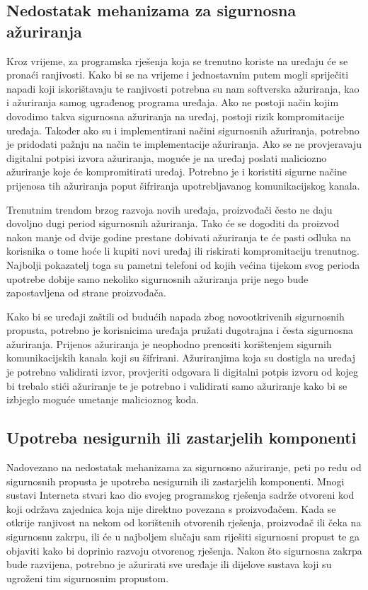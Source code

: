 \documentclass[times, utf8, diplomski]{fer}
\begin{document}
\subsection{Nedostatak mehanizama za sigurnosna ažuriranja}
Kroz vrijeme, za programska rješenja koja se trenutno koriste na uređaju će se pronaći ranjivosti. Kako bi se na vrijeme i jednostavnim putem mogli spriječiti napadi koji iskorištavaju te ranjivosti potrebna su nam softverska ažuriranja, kao i ažuriranja samog ugrađenog programa  uređaja. Ako ne postoji način kojim dovodimo takva sigurnosna ažuriranja na uređaj, postoji rizik kompromitacije uređaja. Također ako su i implementirani načini sigurnosnih ažuriranja, potrebno je pridodati pažnju na način te implementacije ažuriranja. Ako se ne provjeravaju digitalni potpisi izvora ažuriranja, moguće je na uređaj poslati maliciozno ažuriranje koje će kompromitirati uređaj. Potrebno je i koristiti sigurne načine prijenosa tih ažuriranja poput šifriranja upotrebljavanog komunikacijskog kanala. 

Trenutnim trendom brzog razvoja novih uređaja, proizvođači često ne daju dovoljno dugi period sigurnosnih ažuriranja. Tako će se dogoditi da proizvod nakon manje od dvije godine prestane dobivati ažuriranja te će pasti odluka na korisnika o tome hoće li kupiti novi uređaj ili riskirati kompromitaciju trenutnog. Najbolji pokazatelj toga su pametni telefoni od kojih većina tijekom svog perioda upotrebe dobije samo nekoliko sigurnosnih ažuriranja prije nego bude zapostavljena od strane proizvođača.

Kako bi se uređaji zaštili od budućih napada zbog novootkrivenih sigurnosnih propusta, potrebno je korisnicima uređaja pružati dugotrajna i česta sigurnosna ažuriranja. Prijenos ažuriranja je neophodno prenositi korištenjem sigurnih komunikacijskih kanala koji su šifrirani. Ažuriranjima koja su dostigla na uređaj je potrebno validirati izvor, provjeriti odgovara li digitalni potpis izvoru od kojeg bi trebalo stići ažuriranje te je potrebno i validirati samo ažuriranje kako bi se izbjeglo moguće umetanje malicioznog koda.

\subsection{Upotreba nesigurnih ili zastarjelih komponenti}
Nadovezano na nedostatak mehanizama za sigurnosno ažuriranje, peti po redu od sigurnosnih propusta je upotreba nesigurnih ili zastarjelih komponenti. Mnogi sustavi Interneta stvari kao dio svojeg programskog rješenja sadrže otvoreni kod koji održava zajednica koja nije direktno povezana s proizvođačem. Kada se otkrije ranjivost na nekom od korištenih otvorenih rješenja, proizvođač ili čeka na sigurnosnu zakrpu, ili će u najboljem slučaju sam riješiti sigurnosni propust te ga objaviti kako bi doprinio razvoju otvorenog rješenja. Nakon što sigurnosna zakrpa bude razvijena, potrebno je ažurirati sve uređaje ili dijelove sustava koji su ugroženi tim sigurnosnim propustom. 
\end{document}
